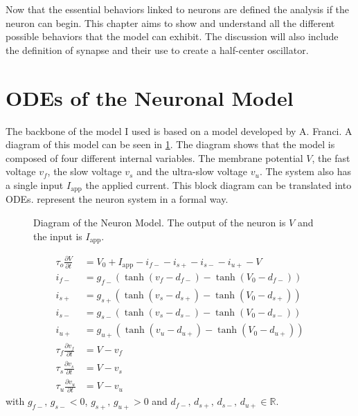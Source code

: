 \label{sec:model}

Now that the essential behaviors linked to neurons are defined the analysis if the neuron can begin.
This chapter aims to show and understand all the different possible behaviors that the model can exhibit.
The discussion will also include the definition of synapse and their use to create a half-center oscillator.

\section{ODEs of the Neuronal Model}

The backbone of the model I used is based on a model developed by A. Franci. 
A diagram of this model can be seen in \cref{fig:neuron_mod}. 
The diagram shows that the  model is composed of four different internal variables.
The membrane potential $V$, the fast voltage $v_f$, the slow voltage $v_s$ and the ultra-slow voltage $v_u$.
The system also has a single input $I_\text{app}$ the applied current.
This block diagram can be translated into ODEs. 
 represent the neuron system in a formal way.

\begin{figure}[!htb]
    \centering
    \caption{Diagram of the Neuron Model. The output of the neuron is $V$ and the input is $I_\text{app}$.}
    \label{fig:neuron_mod}
\end{figure}

\begin{align}
    \tau_o\frac{\partial V}{\partial t} &= V_0 + I_\text{app} - i_{f-} - i_{s+} - i_{s-} - i_{u+} - V\label{eq:neur_start}\\
    i_{f-} &= g_{f-}\left(\tanh\left(v_f-d_{f-}\right) - \tanh\left(V_0-d_{f-}\right)\right)\\ 
    i_{s+} &= g_{s+}\left(\tanh\left(v_s-d_{s+}\right) - \tanh\left(V_0-d_{s+}\right)\right)\\ 
    i_{s-} &= g_{s-}\left(\tanh\left(v_s-d_{s-}\right) - \tanh\left(V_0-d_{s-}\right)\right)\\ 
    i_{u+} &= g_{u+}\left(\tanh\left(v_u-d_{u+}\right) - \tanh\left(V_0-d_{u+}\right)\right)\\ 
    \tau_f\frac{\partial v_f}{\partial t} &= V - v_f\\
    \tau_s\frac{\partial v_s}{\partial t} &= V - v_s\\
    \tau_u\frac{\partial v_u}{\partial t} &= V - v_u\label{eq:neur_end}   
\end{align}
with $g_{f-},\, g_{s-} < 0$, $g_{s+},\, g_{u+} > 0$ and $d_{f-},\, d_{s+},\, d_{s-},\, d_{u+} \in \mathbb{R}$.

